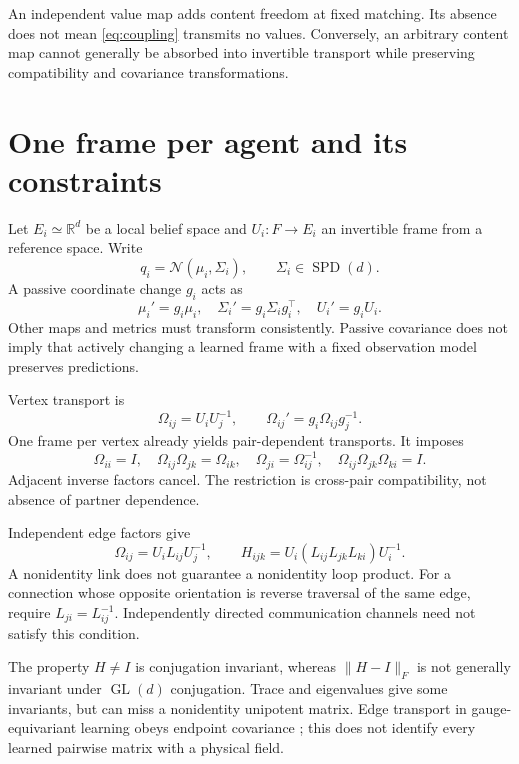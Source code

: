 \documentclass[11pt,letterpaper]{article}
\newcommand{\R}{\mathbb R}
\newcommand{\SPD}{\operatorname{SPD}}
\newcommand{\GL}{\operatorname{GL}}
\theoremstyle{remark}
\begin{document}
An independent value map adds content freedom at fixed matching. Its absence does not mean \eqref{eq:coupling} transmits no values. Conversely, an arbitrary content map cannot generally be absorbed into invertible transport while preserving compatibility and covariance transformations.

\section{One frame per agent and its constraints}
\label{sec:oneframe}
Let $E_i\simeq\R^d$ be a local belief space and $U_i:F\to E_i$ an invertible frame from a reference space. Write
\begin{equation}
 q_i=\mathcal N(\mu_i,\Sigma_i),\qquad \Sigma_i\in\SPD(d).
\end{equation}
A passive coordinate change $g_i$ acts as
\begin{equation}
 \mu_i'=g_i\mu_i,\quad \Sigma_i'=g_i\Sigma_i g_i^\top,\quad U_i'=g_iU_i.
 \label{eq:gauge}
\end{equation}
Other maps and metrics must transform consistently. Passive covariance does not imply that actively changing a learned frame with a fixed observation model preserves predictions.

Vertex transport is
\begin{equation}
 \Omega_{ij}=U_iU_j^{-1},\qquad \Omega_{ij}'=g_i\Omega_{ij}g_j^{-1}.
 \label{eq:flat}
\end{equation}
One frame per vertex already yields pair-dependent transports. It imposes
\begin{equation}
 \Omega_{ii}=I,\quad \Omega_{ij}\Omega_{jk}=\Omega_{ik},\quad
 \Omega_{ji}=\Omega_{ij}^{-1},\quad \Omega_{ij}\Omega_{jk}\Omega_{ki}=I.
\end{equation}
Adjacent inverse factors cancel. The restriction is cross-pair compatibility, not absence of partner dependence.

Independent edge factors give
\begin{equation}
 \Omega_{ij}=U_iL_{ij}U_j^{-1},\qquad
 H_{ijk}=U_i(L_{ij}L_{jk}L_{ki})U_i^{-1}.
 \label{eq:edge}
\end{equation}
A nonidentity link does not guarantee a nonidentity loop product. For a connection whose opposite orientation is reverse traversal of the same edge, require $L_{ji}=L_{ij}^{-1}$. Independently directed communication channels need not satisfy this condition.

The property $H\ne I$ is conjugation invariant, whereas $\|H-I\|_F$ is not generally invariant under $\GL(d)$ conjugation. Trace and eigenvalues give some invariants, but can miss a nonidentity unipotent matrix. Edge transport in gauge-equivariant learning obeys endpoint covariance \cite{deHaan2021,Weiler2021}; this does not identify every learned pairwise matrix with a physical field.
\end{document}
